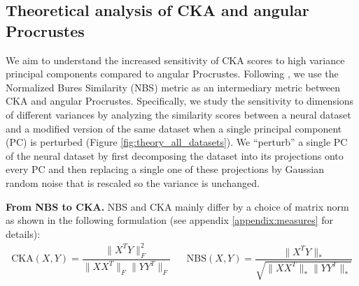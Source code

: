 \documentclass{article} %
\begin{document}
\subsection{Theoretical analysis of CKA and angular Procrustes} \label{theory_nbs_cka}
We aim to understand the increased sensitivity of CKA scores to high variance principal components compared to angular Procrustes. Following \citet{harvey2023duality}, we use the Normalized Bures Similarity (NBS) metric as an intermediary metric between CKA and angular Procrustes. Specifically, we study the sensitivity to dimensions of different variances by analyzing the similarity scores between a neural dataset and a modified version of the same dataset when a single principal component (PC) is perturbed (Figure \ref{fig:theory_all_datasets}). We ``perturb'' a single PC of the neural dataset by first decomposing the dataset into its projections onto every PC and then replacing a single one of these projections by Gaussian random noise that is rescaled so the variance is unchanged.




\textbf{From NBS to CKA.} NBS and CKA mainly differ by a choice of matrix norm as shown in the following formulation \citep{harvey2023duality} (see appendix \ref{appendix:measures} for details):
\begin{align*}
\text{CKA}(X, Y) = \dfrac{\| X^T Y \|^2_F}{\| X X^T \|_F \| Y Y^T \|_F} && \text{NBS}(X, Y) = \dfrac{\|X^T Y\|_*}{\sqrt{\|X X^T\|_* \|Y Y^T\|_*}}
\end{align*}


\end{document}
